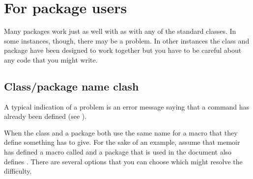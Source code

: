 \chapter{For package users} \label{chap:packageusers}

    Many packages work just as well with  as with any of the
standard classes. In some instances, though, there may be a problem. In other
instances the class and package have been designed to work together but
you have to be careful about any code that you might write.

\section{Class/package name clash} \label{sec:nameclash}

    A typical indication of a problem is an error message saying that a 
command has already been defined 
(see ).

    When the class and a package both use the same name for a macro that
they define something has to give. For the sake of an example, assume that
memoir has defined a macro called  and a package  
that is used in the
document also defines . There are several options that you can 
choose which might resolve the difficulty.

